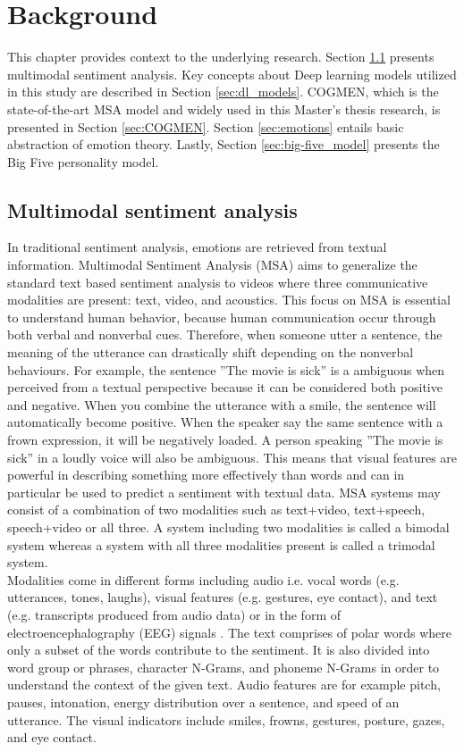 \chapter{Background}
\label{chap:background}
This chapter provides context to the underlying research. Section \ref{sec:msa_intro} presents multimodal sentiment analysis. Key concepts about Deep learning models utilized in this study are described in Section \ref{sec:dl_models}. COGMEN, which is the state-of-the-art MSA model and widely used in this Master's thesis research, is presented in Section \ref{sec:COGMEN}. Section \ref{sec:emotions} entails basic abstraction of emotion theory. Lastly, Section \ref{sec:big-five_model} presents the Big Five personality model. 

\section{Multimodal sentiment analysis}
\label{sec:msa_intro}
In traditional sentiment analysis, emotions are retrieved from textual information. Multimodal Sentiment Analysis (MSA) aims to generalize the standard text based sentiment analysis to videos where three communicative modalities are present: text, video, and acoustics. This focus on MSA is essential to understand human behavior, because human communication occur through both verbal and nonverbal cues. Therefore, when someone utter a sentence, the meaning of the utterance can drastically shift depending on the nonverbal behaviours. For example, the sentence ''The movie is sick'' is a ambiguous when perceived from a textual perspective because it can be considered both positive and negative. When you combine the utterance with a smile, the sentence will automatically become positive. When the speaker say the same sentence with a frown expression, it will be negatively loaded. A person speaking ''The movie is sick'' in a loudly voice will also be ambiguous. This means that visual features are powerful in describing something more effectively than words and can in particular be used to predict a sentiment with textual data. MSA systems may consist of a combination of two modalities such as text+video, text+speech, speech+video or all three. A system including two modalities is called a bimodal system whereas a system with all three modalities present is called a trimodal system. \\

Modalities come in different forms including audio i.e. vocal words (e.g. utterances, tones, laughs), visual features (e.g. gestures, eye contact), and text (e.g. transcripts produced from audio data) or in the form of electroencephalography (EEG) signals \cite{MSA-review-3-9686504}. The text comprises of polar words where only a subset of the words contribute to the sentiment. It is also divided into word group or phrases, character N-Grams, and phoneme N-Grams in order to understand the context of the given text. Audio features are for example pitch, pauses, intonation, energy distribution over a sentence, and speed of an utterance. The visual indicators include smiles, frowns, gestures, posture, gazes, and eye contact. 


